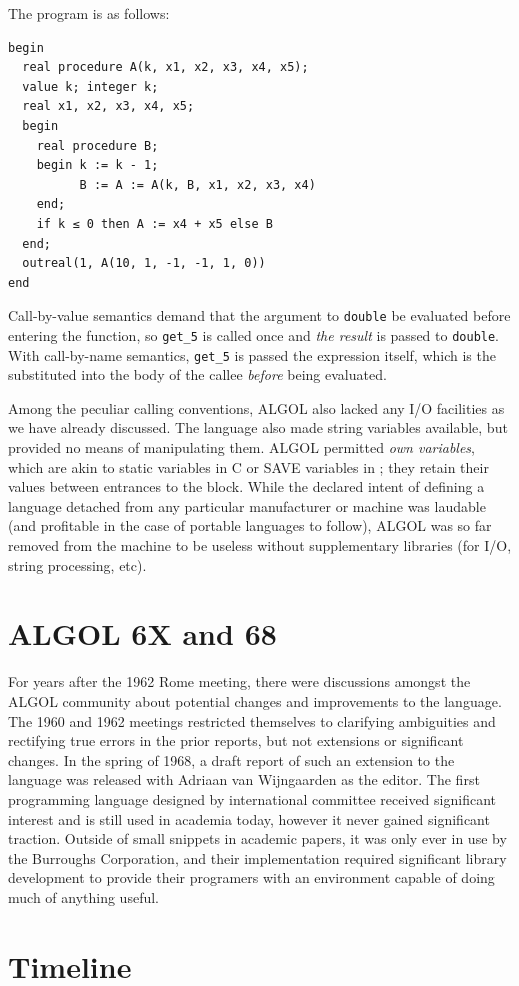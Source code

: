 The program is as follows:

\begin{lstlisting}[language=algol,frame=single]
begin
  real procedure A(k, x1, x2, x3, x4, x5);
  value k; integer k;
  real x1, x2, x3, x4, x5;
  begin
    real procedure B;
    begin k := k - 1;
          B := A := A(k, B, x1, x2, x3, x4)
    end;
    if k ≤ 0 then A := x4 + x5 else B
  end;
  outreal(1, A(10, 1, -1, -1, 1, 0))
end

\end{lstlisting}

Call-by-value semantics demand that the argument to \texttt{double} be evaluated
before entering the function, so \texttt{get\_5} is called once and
\textit{the result} is passed to \texttt{double}.
With call-by-name semantics, \texttt{get\_5} is passed the expression itself,
which is the substituted into the body of the callee \textit{before}
being evaluated.

Among the peculiar calling conventions, ALGOL also lacked any I/O facilities
as we have already discussed.
The language also made string variables available, but provided no means of
manipulating them.
ALGOL permitted \textit{own variables}, which are akin to static variables in C
or SAVE variables in \FTN{}; they retain their values between entrances to the block.
While the declared intent of defining a language detached from any particular
manufacturer or machine was laudable (and profitable in the case of portable 
languages to follow), ALGOL was so far removed from the machine to be useless without
supplementary libraries (for I/O, string processing, etc).

\section{ALGOL 6X and 68}

For years after the 1962 Rome meeting, there were discussions amongst the ALGOL
community about potential changes and improvements to the language.
The 1960 and 1962 meetings restricted themselves to clarifying ambiguities
and rectifying true errors in the prior reports, but not extensions or
significant changes.
In the spring of 1968, a draft report of such an extension to the language 
was released with Adriaan van Wijngaarden as the editor.
The first programming language designed by international committee received
significant interest and is still used in academia today, however it never
gained significant traction.
Outside of small snippets in academic papers, it was only ever in use by
the Burroughs Corporation\cite{burroughs1963bac220},
and their implementation required significant library
development to provide their programers with an environment capable of doing
much of anything useful.



\pagebreak
\section{Timeline}

